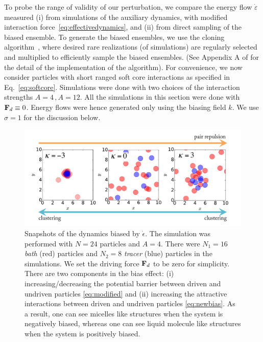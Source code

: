 \documentclass[pre, superscriptaddress, twocolumn,pre]{revtex4-1}
\begin{document}
To probe the range of validity of our perturbation, we compare the energy flow $\dot\varepsilon$ measured (i) from simulations of the auxiliary dynamics, with modified interaction force~\eqref{eq:effectivedynamics}, and (ii) from direct sampling of the biased ensemble. To generate the biased ensembles, we use the cloning algorithm~\cite{Giadina2006,tailleur2007probing,Hurtado2009,Nemoto2016,Ray2018,Klymko2018,Brewer2018}, where desired rare realizations (of simulations) are regularly selected and multiplied to efficiently sample the biased ensembles. (See Appendix A of \cite{Nemoto2016} for the detail of the implementation of the algorithm). For convenience, we now consider particles with short ranged soft core interactions as specified in Eq.~\ref{eq:softcore}. Simulations were done with two choices of the interaction strengths $A=4\,,A=12$. All the simulations in this section were done with ${\bf F}_d\equiv 0$. Energy flows were hence generated only using the biasing field $k$. We use $\sigma=1$ for the discussion below. 
\begin{figure}
	\centering
\includegraphics[width=\linewidth]{Fig_outofperturbation}
	\caption{\label{fig:outofperturbation}
Snapshots of the dynamics biased by $\dot \epsilon$. The simulation was performed with $N=24$ particles and $A=4$.  There were $N_1=16$ \textit{bath} (red) particles and $N_2=8$ \textit{tracer} (blue) particles in the simulations. 
We set the driving force ${\bf F}_d$ to be zero for simplicity. There are two components in the bias effect: (i) increasing/decreasing the potential barrier between driven and undriven particles \eqref{eq:modified} and (ii) increasing the attractive interactions between driven and undriven particles \eqref{eq:newbias}. As a result, one can see micelles like structures when the system is negatively biased, whereas one can see liquid molecule like structures when the system is positively biased.  
	}
\end{figure}
\end{document}

